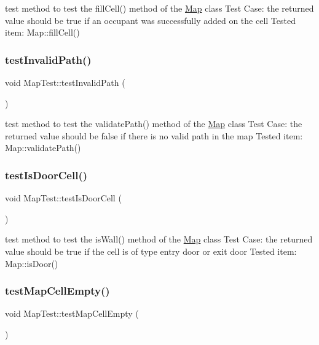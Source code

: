 test method to test the fill\+Cell() method of the \hyperlink{classMap}{Map} class Test Case\+: the returned value should be true if an occupant was successfully added on the cell Tested item\+: Map\+::fill\+Cell() \hypertarget{classMapTest_ad8823027d386c8d25f378d02adad120d}{}\label{classMapTest_ad8823027d386c8d25f378d02adad120d} 
\subsubsection{\texorpdfstring{test\+Invalid\+Path()}{testInvalidPath()}}
{\footnotesize\ttfamily void Map\+Test\+::test\+Invalid\+Path (\begin{DoxyParamCaption}{ }\end{DoxyParamCaption})\hspace{0.3cm}{\ttfamily [protected]}}

test method to test the validate\+Path() method of the \hyperlink{classMap}{Map} class Test Case\+: the returned value should be false if there is no valid path in the map Tested item\+: Map\+::validate\+Path() \hypertarget{classMapTest_a87e123f3f250492e1c444f0a3c8338b5}{}\label{classMapTest_a87e123f3f250492e1c444f0a3c8338b5} 
\subsubsection{\texorpdfstring{test\+Is\+Door\+Cell()}{testIsDoorCell()}}
{\footnotesize\ttfamily void Map\+Test\+::test\+Is\+Door\+Cell (\begin{DoxyParamCaption}{ }\end{DoxyParamCaption})\hspace{0.3cm}{\ttfamily [protected]}}

test method to test the is\+Wall() method of the \hyperlink{classMap}{Map} class Test Case\+: the returned value should be true if the cell is of type entry door or exit door Tested item\+: Map\+::is\+Door() \hypertarget{classMapTest_a83bb3473f74089996c7f6bee8d59a97c}{}\label{classMapTest_a83bb3473f74089996c7f6bee8d59a97c} 
\subsubsection{\texorpdfstring{test\+Map\+Cell\+Empty()}{testMapCellEmpty()}}
{\footnotesize\ttfamily void Map\+Test\+::test\+Map\+Cell\+Empty (\begin{DoxyParamCaption}{ }\end{DoxyParamCaption})\hspace{0.3cm}{\ttfamily [protected]}}

